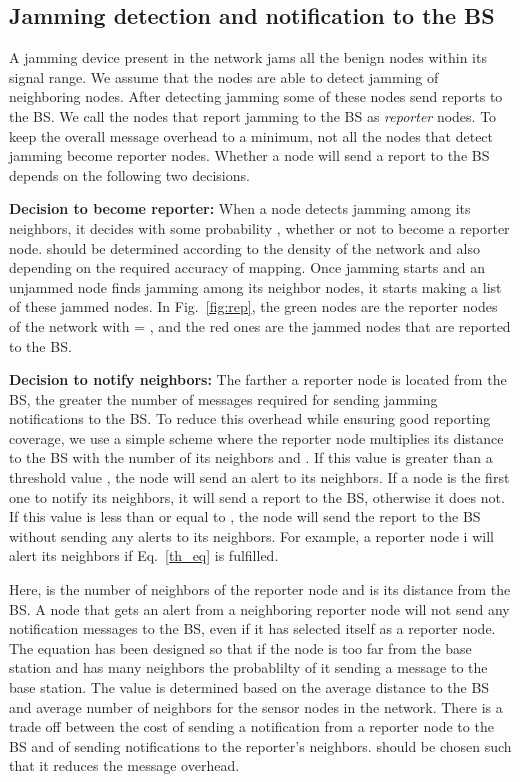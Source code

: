 \documentclass[conference]{IEEEtran}
\begin{document}
\subsection{Jamming detection and notification to the BS}\label{detect}
A jamming device present in the network jams all the benign nodes within its signal range. We assume that the nodes are able to detect jamming of neighboring nodes. After detecting jamming some of these nodes send reports to the BS. We call the nodes that report jamming to the BS as {\em reporter} nodes. To keep the overall message overhead to a minimum, not all the nodes that detect jamming become reporter nodes. Whether a node will send a report to the BS depends on the following two decisions.
\begin{list}{}{\leftmargin=1em}
\item
{\bf Decision to become reporter:} When a node detects jamming among its neighbors, it decides with some probability , whether or not to become a reporter node.  should be determined according to the density of the network and also depending on the required accuracy of mapping. Once jamming starts and an unjammed node finds jamming among its neighbor nodes, it starts making a list of these jammed nodes. In Fig.~\ref{fig:rep}, the green nodes are the reporter nodes of the network with  = , and the red ones are the jammed nodes that are reported to the BS.

\item
{\bf Decision to notify neighbors:} The farther a reporter node is located from the BS, the greater the number of messages required for sending jamming notifications to the BS. To reduce this overhead while ensuring good reporting coverage, we use a simple scheme where the reporter node multiplies its distance to the BS with the number of its neighbors and  . If this value is greater than a threshold value , the node will send an alert to its neighbors. If a node is the first one to notify its neighbors, it will send a report to the BS, otherwise it does not. If this value is less than or equal to , the node will send the report to the BS without sending any alerts to its neighbors. For example, a reporter node i will alert its neighbors if Eq.~\ref{th_eq} is fulfilled.

Here,  is the number of neighbors of the reporter node and  is its distance from the BS. 
A node that gets an alert from a neighboring reporter node will not send any notification messages to the BS, even if it has selected itself as a reporter node. 
\indent
The equation has been designed so that if the node is too far from the base station and has many neighbors the probablilty of it sending a message to the base station. The value  is determined based on the average distance to the BS and average number of neighbors for the sensor nodes in the network. There is a trade off between the cost of sending a notification from a reporter node to the BS and of sending notifications to the reporter's neighbors.  should be chosen such that it reduces the message overhead. 

\end{list}
\end{document}
